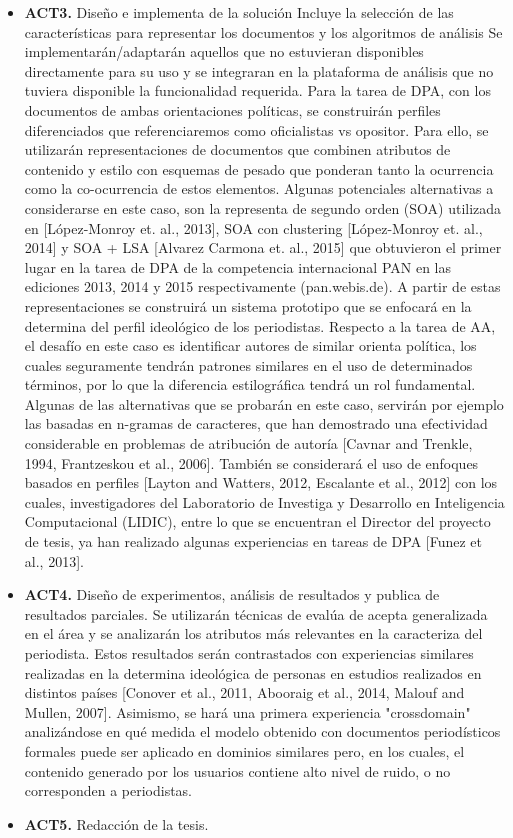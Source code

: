 \documentclass[12pt, runningheads,a4]{book}
\begin{document}
\begin{itemize}
	\item  \textbf{ACT3.} Diseño e implementa de la solución Incluye la selección de las características para representar los documentos y los algoritmos de análisis Se implementarán/adaptarán aquellos que no estuvieran disponibles directamente para su uso y se integraran en la plataforma de análisis que no tuviera disponible la funcionalidad requerida. Para la tarea de DPA, con los documentos de ambas orientaciones políticas, se construirán perfiles diferenciados que referenciaremos como oficialistas vs opositor. Para ello, se utilizarán representaciones de documentos que combinen atributos de contenido y estilo con esquemas de pesado que ponderan tanto la ocurrencia como la co-ocurrencia de estos elementos. Algunas potenciales alternativas a considerarse en este caso, son la representa de segundo orden (SOA) utilizada en [López-Monroy et. al., 2013], SOA con clustering [López-Monroy et. al., 2014] y SOA + LSA [Alvarez Carmona et. al., 2015] que obtuvieron el primer lugar en la tarea de DPA de la competencia internacional PAN en las ediciones 2013, 2014 y 2015 respectivamente (pan.webis.de). A partir de estas representaciones se construirá un sistema prototipo que se enfocará en la determina del perfil ideológico de los periodistas. Respecto a la tarea de AA, el desafío en este caso es identificar autores de similar orienta política, los cuales seguramente tendrán patrones similares en el uso de
	determinados términos, por lo que la diferencia estilográfica tendrá un rol fundamental. Algunas de las alternativas que se probarán en este caso, servirán por ejemplo las basadas en n-gramas de caracteres, que han demostrado una efectividad considerable en problemas de atribución de autoría [Cavnar and Trenkle, 1994, Frantzeskou et al., 2006].
	También se considerará el uso de enfoques basados en perfiles [Layton and Watters, 2012, Escalante et al., 2012] con los cuales, investigadores del Laboratorio de Investiga y Desarrollo en Inteligencia Computacional (LIDIC), entre lo que se encuentran el Director del proyecto de tesis, ya han realizado algunas experiencias en tareas de DPA [Funez et al.,
	2013].
	
	\item  \textbf{ACT4.} Diseño de experimentos, análisis de resultados y publica de resultados parciales. Se utilizarán técnicas de evalúa de acepta generalizada en el área y se analizarán los atributos más relevantes en la caracteriza del periodista. Estos resultados serán contrastados con experiencias similares realizadas en la determina ideológica de personas en estudios realizados en distintos países [Conover et al., 2011, Abooraig et al., 2014, Malouf and Mullen, 2007]. Asimismo, se hará una primera experiencia "crossdomain" analizándose en qué medida el modelo obtenido con documentos periodísticos formales puede ser aplicado en dominios similares pero, en los cuales, el contenido generado por los usuarios contiene alto nivel de ruido, o no corresponden a periodistas.
	
	\item  \textbf{ACT5.} Redacción de la tesis.
	
\end{itemize}
\end{document}
